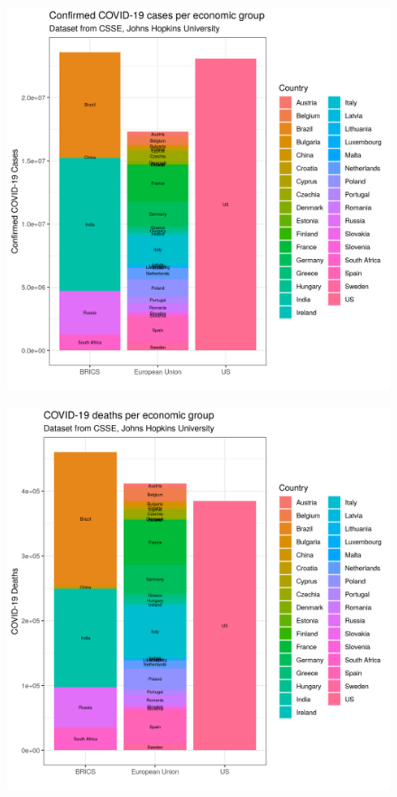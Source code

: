 \begin{figure}[H]
\centering
\begin{minipage}{.5\textwidth}
  \centering
  \includegraphics[width=1\linewidth]{images/aggr_econ_conf.png}
  \label{fig:aggr_econ_conf}
\end{minipage}%
\begin{minipage}{.5\textwidth}
  \centering
  \includegraphics[width=1\linewidth]{images/aggr_econ_deaths.png}
  \label{fig:aggr_econ_deaths}
\end{minipage}
\end{figure}

